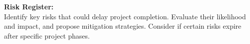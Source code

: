 \documentclass[11pt,oneside]{book}
\begin{document}
\vspace{1em}

\newpage

\noindent
\textbf{Risk Register:} \\
Identify key risks that could delay project completion. Evaluate their likelihood and impact, and propose mitigation strategies. Consider if certain risks expire after specific project phases.

\begin{center}
    \begin{table}[ht]
        \centering
    \end{table} 
\end{center}

\vspace{1em}
\end{document}

